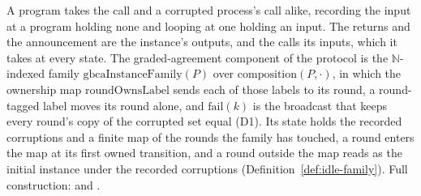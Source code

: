 \begin{definition}
  A program takes the call and a corrupted process's call alike, recording the input at a program holding none and looping at one holding an input.
  The returns and the announcement are the instance's outputs, and the calls its inputs, which it takes at every state.
  The graded-agreement component of the protocol is the $\mathbb{N}$-indexed family $\mathrm{gbcaInstanceFamily}(P)$ over $\mathrm{composition}(P,\cdot)$, in which the ownership map $\mathrm{roundOwnsLabel}$ sends each of those labels to its round, a round-tagged label moves its round alone, and $\mathrm{fail}(k)$ is the broadcast that keeps every round's copy of the corrupted set equal (D1).
  Its state holds the recorded corruptions and a finite map of the rounds the family has touched, a round enters the map at its first owned transition, and a round outside the map reads as the initial instance under the recorded corruptions (Definition~\ref{def:idle-family}).
  Full construction:  and .
\end{definition}
